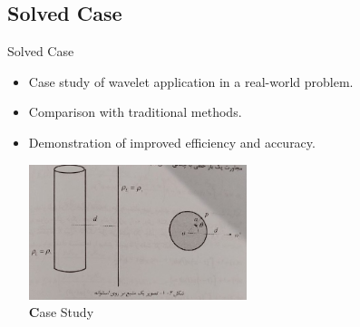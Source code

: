 \documentclass{beamer}
\begin{document}
\subsection{Solved Case}
\begin{frame}{Solved Case}
    \begin{itemize}
        \item Case study of wavelet application in a real-world problem.
        \item Comparison with traditional methods.
        \item Demonstration of improved efficiency and accuracy.\\[0.5cm]
        \vfil
        \centering
        
        \includegraphics[width=0.5\textwidth, height=0.4\textheight]{Case.jpg} %
        \\[0.2cm] %
        {\small \textbf Case Study} %
    \end{itemize}
\end{frame}

\end{document}

